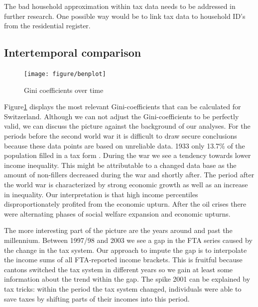 \documentclass[twoside]{article}\usepackage[]{graphicx}\usepackage[]{color}
\newenvironment{knitrout}{}{} %
\begin{document}
\begin{multicols}{2}
The bad household approximation within tax data needs to be addressed in further research. One possible way would be to link tax data to household ID's from the residential register.


\subsection{Intertemporal comparison}



\begin{knitrout}
\color{fgcolor}\begin{figure}[H]

\texttt{[image: figure/benplot]} \caption[Gini coefficients over time]{Gini coefficients over time\label{fig:benplot}}
\end{figure}


\end{knitrout}

Figure\ref{fig:benplot} displays the most relevant Gini-coefficients that can be calculated for Switzerland. Although we can not adjust the Gini-coefficients to be perfectly valid, we can discuss the picture against the background of our analyses. For the periods before the second world war it is difficult to draw secure conclusions because these data points are based on unreliable data. 1933 only 13.7\% of the population filled in a tax form \citep{dell_income_2005}. During the war we see a tendency towards lower income inequality. This might be attributable to a changed data base as the amount of non-fillers decreased during the war and shortly after. The period after the world war is characterized by strong economic growth as well as an increase in inequality. Our interpretation is that high income percentiles disproportionately profited from the economic upturn. After the oil crises there were alternating phases of social welfare expansion and economic upturns.

The more interesting part of the picture are the years around and past the millennium. Between 1997/98 and 2003 we see a gap in the FTA series caused by the change in the tax system. Our approach to impute the gap is to interpolate the income sums of all FTA-reported income brackets. This is fruitful because cantons switched the tax system in different years so we gain at least some information about the trend within the gap. The spike 2001 can be explained by tax tricks: within the period the tax system changed, individuals were able to save taxes by shifting parts of their incomes into this period. 


\end{multicols}
\end{document}
